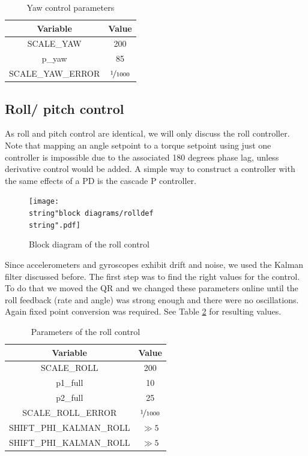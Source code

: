 \documentclass[11pt]{article}
\begin{document}
%
\begin{table}[h]
\centering

\begin{tabular}{|c|c|}
\hline 
Variable & Value\tabularnewline
\hline 
SCALE\_YAW & 200\tabularnewline
\hline 
p\_yaw & 85\tabularnewline
\hline 
SCALE\_YAW\_ERROR & $\nicefrac{1}{1000}$\tabularnewline
\hline
\end{tabular}

\caption{Yaw control parameters}
\label{yawparam}

\end{table}



\subsection{Roll/ pitch control}

As roll and pitch control are identical, we will only discuss the
roll controller. Note that mapping an angle setpoint to a torque setpoint
using just one controller is impossible due to the associated 180
degrees phase lag, unless derivative control would be added. A simple
way to construct a controller with the same effects of a PD is the cascade
P controller.

%
\begin{figure}[ht]
\centering

\texttt{[image: \\string"block diagrams/rolldef\\string".pdf]}

\caption{Block diagram of the roll control}

\end{figure}


Since accelerometers and gyroscopes exhibit drift and noise, 
we used the Kalman filter discussed before. The first step was
to find the right values for the control. To do that we moved the
QR and we changed these parameters online until the roll feedback (rate
and angle) was strong enough and there were no oscillations.\\
Again fixed point conversion was required. See Table \ref{rollparam} for resulting values.

%
\begin{table}[ht]
\centering

\begin{tabular}{|c|c|}
\hline 
Variable & Value\tabularnewline
\hline 
SCALE\_ROLL & 200\tabularnewline
\hline 
p1\_full & 10\tabularnewline
\hline 
p2\_full & 25\tabularnewline
\hline 
SCALE\_ROLL\_ERROR & $\nicefrac{1}{1000}$\tabularnewline
\hline 
SHIFT\_PHI\_KALMAN\_ROLL & $\gg5$\tabularnewline
\hline 
SHIFT\_PHI\_KALMAN\_ROLL & $\gg5$\tabularnewline
\hline
\end{tabular}
\label{rollparam}
\caption{Parameters of the roll control}

\end{table}
\end{document}

